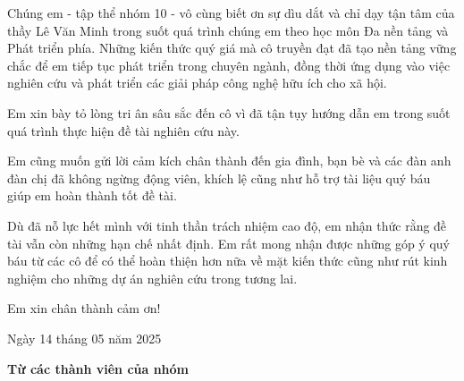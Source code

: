 \documentclass[main.tex]{subfiles}
\begin{document}
Chúng em - tập thể nhóm 10 - vô cùng biết ơn sự dìu dắt và chỉ dạy tận tâm của thầy Lê Văn Minh trong suốt quá trình chúng em theo học môn Đa nền tảng và Phát triển phía. Những kiến thức quý giá mà cô truyền đạt đã tạo nền tảng vững chắc để em tiếp tục phát triển trong chuyên ngành, đồng thời ứng dụng vào việc nghiên cứu và phát triển các giải pháp công nghệ hữu ích cho xã hội.

Em xin bày tỏ lòng tri ân sâu sắc đến cô vì đã tận tụy hướng dẫn em trong suốt quá trình thực hiện đề tài nghiên cứu này.

Em cũng muốn gửi lời cảm kích chân thành đến gia đình, bạn bè và các đàn anh đàn chị đã không ngừng động viên, khích lệ cũng như hỗ trợ tài liệu quý báu giúp em hoàn thành tốt đề tài.

Dù đã nỗ lực hết mình với tinh thần trách nhiệm cao độ, em nhận thức rằng đề tài vẫn còn những hạn chế nhất định. Em rất mong nhận được những góp ý quý báu từ các cô để có thể hoàn thiện hơn nữa về mặt kiến thức cũng như rút kinh nghiệm cho những dự án nghiên cứu trong tương lai.
\vspace{6pt}
\begin{flushright} Em xin chân thành cảm ơn! \end{flushright}

\hspace{12cm}Ngày 14 tháng 05 năm 2025

\vspace{2cm}

\hspace{11.75cm}\textbf{Từ các thành viên của nhóm}
\end{document}
